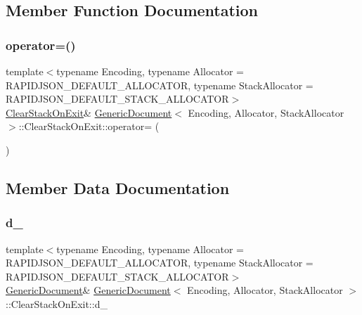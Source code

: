 \subsection{Member Function Documentation}
\mbox{\label{structGenericDocument_1_1ClearStackOnExit_a474a254254f2deaba8c98ea79dc9c0f1}} 
\subsubsection{\texorpdfstring{operator=()}{operator=()}}
{\footnotesize\ttfamily template$<$typename Encoding, typename Allocator = R\+A\+P\+I\+D\+J\+S\+O\+N\+\_\+\+D\+E\+F\+A\+U\+L\+T\+\_\+\+A\+L\+L\+O\+C\+A\+T\+OR, typename Stack\+Allocator = R\+A\+P\+I\+D\+J\+S\+O\+N\+\_\+\+D\+E\+F\+A\+U\+L\+T\+\_\+\+S\+T\+A\+C\+K\+\_\+\+A\+L\+L\+O\+C\+A\+T\+OR$>$ \\
\hyperlink{structGenericDocument_1_1ClearStackOnExit}{Clear\+Stack\+On\+Exit}\& \hyperlink{classGenericDocument}{Generic\+Document}$<$ Encoding, Allocator, Stack\+Allocator $>$\+::Clear\+Stack\+On\+Exit\+::operator= (\begin{DoxyParamCaption}\item[{const \hyperlink{structGenericDocument_1_1ClearStackOnExit}{Clear\+Stack\+On\+Exit} \&}]{ }\end{DoxyParamCaption})\hspace{0.3cm}{\ttfamily [private]}}



\subsection{Member Data Documentation}
\mbox{\label{structGenericDocument_1_1ClearStackOnExit_a56c2e82730f07911288b42640b029dc3}} 
\subsubsection{\texorpdfstring{d\+\_\+}{d\_}}
{\footnotesize\ttfamily template$<$typename Encoding, typename Allocator = R\+A\+P\+I\+D\+J\+S\+O\+N\+\_\+\+D\+E\+F\+A\+U\+L\+T\+\_\+\+A\+L\+L\+O\+C\+A\+T\+OR, typename Stack\+Allocator = R\+A\+P\+I\+D\+J\+S\+O\+N\+\_\+\+D\+E\+F\+A\+U\+L\+T\+\_\+\+S\+T\+A\+C\+K\+\_\+\+A\+L\+L\+O\+C\+A\+T\+OR$>$ \\
\hyperlink{classGenericDocument}{Generic\+Document}\& \hyperlink{classGenericDocument}{Generic\+Document}$<$ Encoding, Allocator, Stack\+Allocator $>$\+::Clear\+Stack\+On\+Exit\+::d\+\_\+\hspace{0.3cm}{\ttfamily [private]}}



